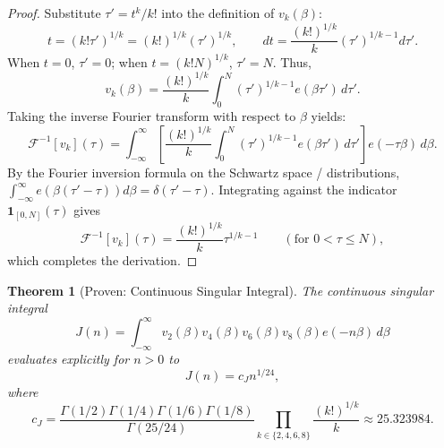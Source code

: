 \documentclass[11pt, a4paper]{article}
\theoremstyle{plain}
\newtheorem{theorem}{Theorem}[section]
\theoremstyle{definition}
\begin{document}
\begin{proof}
Substitute $\tau' = t^k / k!$ into the definition of $v_k(\beta)$:
\[
t = (k! \tau')^{1/k} = (k!)^{1/k} (\tau')^{1/k}, \qquad dt = \frac{(k!)^{1/k}}{k} (\tau')^{1/k - 1} d\tau'.
\]
When $t = 0$, $\tau' = 0$; when $t = (k! N)^{1/k}$, $\tau' = N$. Thus,
\[
v_k(\beta) = \frac{(k!)^{1/k}}{k} \int_0^N (\tau')^{1/k - 1} e(\beta \tau')\,d\tau'.
\]
Taking the inverse Fourier transform with respect to $\beta$ yields:
\[
\mathcal{F}^{-1}[v_k](\tau) = \int_{-\infty}^\infty \left[ \frac{(k!)^{1/k}}{k} \int_0^N (\tau')^{1/k - 1} e(\beta \tau')\,d\tau' \right] e(-\tau\beta)\,d\beta.
\]
By the Fourier inversion formula on the Schwartz space / distributions, $\int_{-\infty}^\infty e(\beta(\tau' - \tau)) d\beta = \delta(\tau' - \tau)$. Integrating against the indicator $\mathbf{1}_{[0,N]}(\tau)$ gives
\[
\mathcal{F}^{-1}[v_k](\tau) = \frac{(k!)^{1/k}}{k} \tau^{1/k - 1} \qquad (\text{for } 0 < \tau \leq N),
\]
which completes the derivation.
\end{proof}

\begin{theorem}[Proven: Continuous Singular Integral]\label{thm:singular_integral}
The continuous singular integral
\begin{equation}
J(n) = \int_{-\infty}^{\infty} v_2(\beta) v_4(\beta) v_6(\beta) v_8(\beta) e(-n\beta)\,d\beta
\end{equation}
evaluates explicitly for $n > 0$ to
\begin{equation}
J(n) = c_J n^{1/24},
\end{equation}
where
\begin{equation}
c_J = \frac{\Gamma(1/2)\Gamma(1/4)\Gamma(1/6)\Gamma(1/8)}{\Gamma(25/24)} \prod_{k \in \{2,4,6,8\}} \frac{(k!)^{1/k}}{k} \approx 25.323984.
\end{equation}
\end{theorem}
\end{document}

